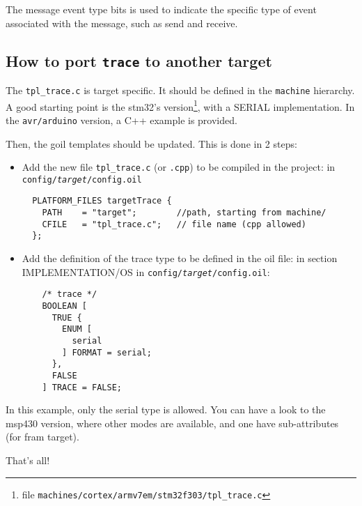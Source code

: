 The message event type bits is used to indicate the specific type of event associated with the message, such as send and receive.

\subsection{How to port \texttt{trace} to another target}

The \texttt{tpl\_trace.c} is target specific. It should be defined in the \lstinline{machine} hierarchy. A good starting point is the stm32's version\footnote{file \texttt{machines/cortex/armv7em/stm32f303/tpl_trace.c}}, with a SERIAL implementation. In the \texttt{avr/arduino} version, a C++ example is provided.

Then, the goil templates should be updated. This is done in 2 steps:

\begin{itemize}
	\item Add the new file \texttt{tpl\_trace.c} (or \texttt{.cpp}) to be compiled in the project: in \texttt{config/\textit{target}/config.oil} \\
\begin{lstlisting}
  PLATFORM_FILES targetTrace {
    PATH    = "target";        //path, starting from machine/
    CFILE   = "tpl_trace.c";   // file name (cpp allowed)
  };
\end{lstlisting}

	\item Add the definition of the trace type to be defined in the oil file: in section IMPLEMENTATION/OS in \texttt{config/\textit{target}/config.oil}:
\begin{lstlisting}
    /* trace */
    BOOLEAN [
      TRUE {
        ENUM [
          serial
        ] FORMAT = serial;
      },
      FALSE
    ] TRACE = FALSE;
\end{lstlisting}
\end{itemize}

In this example, only the serial type is allowed. You can have a look to the msp430 version, where other modes are available, and one have sub-attributes (for fram target).

That's all!
